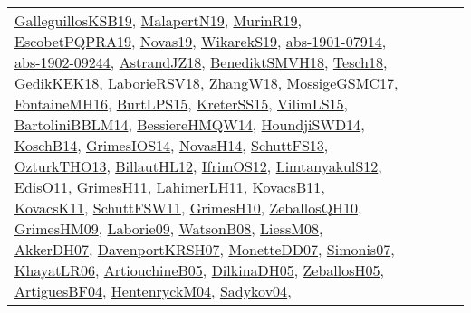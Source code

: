 {\begin{longtable}{llp{6cm}p{6cm}p{6cm}}
\href{papers/GalleguillosKSB19.pdf}{GalleguillosKSB19}\cite{GalleguillosKSB19}, \href{papers/MalapertN19.pdf}{MalapertN19}\cite{MalapertN19}, \href{papers/MurinR19.pdf}{MurinR19}\cite{MurinR19}, \href{articles/EscobetPQPRA19.pdf}{EscobetPQPRA19}\cite{EscobetPQPRA19}, \href{articles/Novas19.pdf}{Novas19}\cite{Novas19}, \href{articles/WikarekS19.pdf}{WikarekS19}\cite{WikarekS19}, \href{articles/abs-1901-07914.pdf}{abs-1901-07914}\cite{abs-1901-07914}, \href{articles/abs-1902-09244.pdf}{abs-1902-09244}\cite{abs-1902-09244}, \href{papers/AstrandJZ18.pdf}{AstrandJZ18}\cite{AstrandJZ18}, \href{papers/BenediktSMVH18.pdf}{BenediktSMVH18}\cite{BenediktSMVH18}, \href{papers/Tesch18.pdf}{Tesch18}\cite{Tesch18}, \href{articles/GedikKEK18.pdf}{GedikKEK18}\cite{GedikKEK18}, \href{articles/LaborieRSV18.pdf}{LaborieRSV18}\cite{LaborieRSV18}, \href{articles/ZhangW18.pdf}{ZhangW18}\cite{ZhangW18}, \href{papers/MossigeGSMC17.pdf}{MossigeGSMC17}\cite{MossigeGSMC17}, \href{papers/FontaineMH16.pdf}{FontaineMH16}\cite{FontaineMH16}, \href{papers/BurtLPS15.pdf}{BurtLPS15}\cite{BurtLPS15}, \href{papers/KreterSS15.pdf}{KreterSS15}\cite{KreterSS15}, \href{papers/VilimLS15.pdf}{VilimLS15}\cite{VilimLS15}, \href{papers/BartoliniBBLM14.pdf}{BartoliniBBLM14}\cite{BartoliniBBLM14}, \href{papers/BessiereHMQW14.pdf}{BessiereHMQW14}\cite{BessiereHMQW14}, \href{papers/HoundjiSWD14.pdf}{HoundjiSWD14}\cite{HoundjiSWD14}, \href{papers/KoschB14.pdf}{KoschB14}\cite{KoschB14}, \href{articles/GrimesIOS14.pdf}{GrimesIOS14}\cite{GrimesIOS14}, \href{articles/NovasH14.pdf}{NovasH14}\cite{NovasH14}, \href{papers/SchuttFS13.pdf}{SchuttFS13}\cite{SchuttFS13}, \href{articles/OzturkTHO13.pdf}{OzturkTHO13}\cite{OzturkTHO13}, \href{papers/BillautHL12.pdf}{BillautHL12}\cite{BillautHL12}, \href{papers/IfrimOS12.pdf}{IfrimOS12}\cite{IfrimOS12}, \href{articles/LimtanyakulS12.pdf}{LimtanyakulS12}\cite{LimtanyakulS12}, \href{papers/EdisO11.pdf}{EdisO11}\cite{EdisO11}, \href{papers/GrimesH11.pdf}{GrimesH11}\cite{GrimesH11}, \href{papers/LahimerLH11.pdf}{LahimerLH11}\cite{LahimerLH11}, \href{articles/KovacsB11.pdf}{KovacsB11}\cite{KovacsB11}, \href{articles/KovacsK11.pdf}{KovacsK11}\cite{KovacsK11}, \href{articles/SchuttFSW11.pdf}{SchuttFSW11}\cite{SchuttFSW11}, \href{papers/GrimesH10.pdf}{GrimesH10}\cite{GrimesH10}, \href{articles/ZeballosQH10.pdf}{ZeballosQH10}\cite{ZeballosQH10}, \href{papers/GrimesHM09.pdf}{GrimesHM09}\cite{GrimesHM09}, \href{papers/Laborie09.pdf}{Laborie09}\cite{Laborie09}, \href{papers/WatsonB08.pdf}{WatsonB08}\cite{WatsonB08}, \href{articles/LiessM08.pdf}{LiessM08}\cite{LiessM08}, \href{papers/AkkerDH07.pdf}{AkkerDH07}\cite{AkkerDH07}, \href{papers/DavenportKRSH07.pdf}{DavenportKRSH07}\cite{DavenportKRSH07}, \href{papers/MonetteDD07.pdf}{MonetteDD07}\cite{MonetteDD07}, \href{articles/Simonis07.pdf}{Simonis07}\cite{Simonis07}, \href{articles/KhayatLR06.pdf}{KhayatLR06}\cite{KhayatLR06}, \href{papers/ArtiouchineB05.pdf}{ArtiouchineB05}\cite{ArtiouchineB05}, \href{papers/DilkinaDH05.pdf}{DilkinaDH05}\cite{DilkinaDH05}, \href{articles/ZeballosH05.pdf}{ZeballosH05}\cite{ZeballosH05}, \href{papers/ArtiguesBF04.pdf}{ArtiguesBF04}\cite{ArtiguesBF04}, \href{papers/HentenryckM04.pdf}{HentenryckM04}\cite{HentenryckM04}, \href{papers/Sadykov04.pdf}{Sadykov04}\cite{Sadykov04}, 
\end{longtable}}
